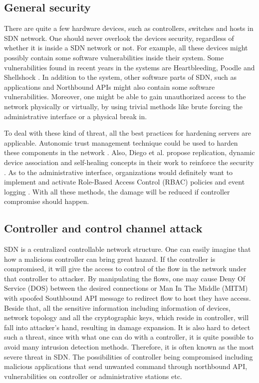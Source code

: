 \subsection{General security}
There are quite a few hardware devices, such as controllers, switches and hosts in SDN network. One should never overlook the devices security, regardless of whether it is inside a SDN network or not. For example, all these devices might possibly contain some software vulnerabilities inside their system. Some vulnerabilities found in recent years in the systems are Heartbleeding, Poodle and Shellshock \cite{HB,POODLE,SHELLSHOCK}. In addition to the system, other software parts of SDN, such as applications and Northbound APIs might also contain some software vulnerabilities. Moreover, one might be able to gain unauthorized access to the network physically or virtually, by using trivial methods like brute forcing the administrative interface or a physical break in. 

To deal with these kind of threat, all the best practices for hardening servers are applicable. Autonomic trust management technique could be used to harden these components in the network \cite{YZP11}. Also, Diego et al. propose replication, dynamic device association and self-healing concepts in their work to reinforce the security \cite{KDFRV13}. As to the administrative interface, organizations would definitely want to implement and activate Role-Based Access Control (RBAC) policies and event logging \cite{FFR09}. With all these methods, the damage will be reduced if controller compromise should happen.

\subsection{Controller and control channel attack}
SDN is a centralized controllable network structure. One can easily imagine that how a malicious controller can bring great hazard. If the controller is compromised, it will give the access to control of the flow in the network under that controller to attacker. By manipulating the flows, one may cause Deny Of Service (DOS) between the desired connections or Man In The Middle (MITM) with spoofed Southbound API message to redirect flow to host they have access. Beside that, all the sensitive information including information of devices, network topology and all the cryptographic keys, which reside in controller, will fall into attacker's hand, resulting in damage expansion. It is also hard to detect such a threat, since with what one can do with a controller, it is quite possible to avoid many intrusion detection methods. Therefore, it is often known as the most severe threat in SDN. The possibilities of controller being compromised including malicious applications that send unwanted command through northbound API, vulnerabilities on controller or administrative stations etc.

